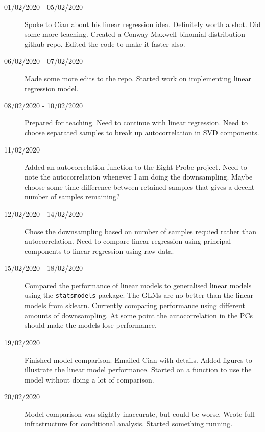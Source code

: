 \documentclass[a4paper,12pt]{article}
\theoremstyle{definition}
\begin{document}
\begin{description}
                                \item[01/02/2020 - 05/02/2020] Spoke to Cian about his linear regression idea. Definitely worth a shot. Did some more teaching. Created a Conway-Maxwell-binomial distribution github repo. Edited the code to make it faster also.

                                \item[06/02/2020 - 07/02/2020] Made some more edits to the repo. Started work on implementing linear regression model.

                                \item[08/02/2020 - 10/02/2020] Prepared for teaching. Need to continue with linear regression. Need to choose separated samples to break up autocorrelation in SVD components.

                                \item[11/02/2020] Added an autocorrelation function to the Eight Probe project. Need to note the autocorrelation whenever I am doing the downsampling. Maybe choose some time difference between retained samples that gives a decent number of samples remaining?

                                \item[12/02/2020 - 14/02/2020] Chose the downsampling based on number of samples requied rather than autocorrelation. Need to compare linear regression using principal components to linear regression using raw data.

                                \item[15/02/2020 - 18/02/2020] Compared the performance of linear models to generalised linear models using the \texttt{statsmodels} package. The GLMs are no better than the linear models from sklearn. Currently comparing performance using different amounts of downsampling. At some point the autocorrelation in the PCs should make the models lose performance.

                                \item[19/02/2020] Finished model comparison. Emailed Cian with details. Added figures to illustrate the linear model performance. Started on a function to use the model without doing a lot of comparison.

                                \item[20/02/2020] Model comparison was slightly inaccurate, but could be worse. Wrote full infrastructure for conditional analysis. Started something running.


\end{description}
\end{document}
